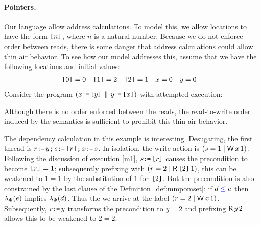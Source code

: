 \paragraph{Pointers.}
Our language allow address calculations.  To model this, we allow locations
to have the form $\texttt{[}n\texttt{]}$, where $n$ is a natural number.  Because we do not
enforce order between reads, there is some danger that address calculations
could allow thin air behavior.   To see how our model addresses this, assume
that we have the following locations and initial values:
\begin{align*}
  \texttt{[}0\texttt{]}&=0  &
  \texttt{[}1\texttt{]}&=2  &
  \texttt{[}2\texttt{]}&=1  &
  x &=0 &
  y &=0 
\end{align*}
Consider the program
\begin{math}
  (x\texttt{:}\mkern-1mu\texttt{=}\,\texttt{[}y\texttt{]} \,\mathbin{\|}\, y\texttt{:}\mkern-1mu\texttt{=}\,\texttt{[}x\texttt{]})
\end{math}
with attempted execution:
\begin{tikzdisplay}[node distance=1em]
\end{tikzdisplay}
Although there is no order enforced between the reads, the read-to-write
order induced by the semantics is sufficient to prohibit this thin-air
behavior.

The dependency calculation in this example is interesting.  Desugaring, the
first thread is $r\texttt{:}\mkern-1mu\texttt{=}\, y\texttt{;}\, s\texttt{:}\mkern-1mu\texttt{=}\, \texttt{[}r\texttt{]}\texttt{;}\, x\texttt{:}\mkern-1mu\texttt{=}\, s$.
In isolation, the write action is $(\bReg=1\mid\DW{x}{1})$.  Following the
discussion of execution \eqref{m1}, $s\texttt{:}\mkern-1mu\texttt{=}\, \texttt{[}r\texttt{]}$ causes the
precondition to become $\texttt{[}r\texttt{]}=1$; subsequently prefixing with
$(\aReg=2\mid\DR{\REF{2}}{1})$, this can be weakened to $1=1$ by the
substitution of $1$ for $\texttt{[}2\texttt{]}$.  But the precondition is also constrained
by the last clause of the Definition~\ref{def:mmpomset}:
 if $d\mathrel{{\color{blue}\leq}}e$ then $\lambda_{\Phi}(e)$ implies $\lambda_{\Phi}(d)$.
%
Thus the we arrive at the label $(\aReg=2\mid\DW{x}{1})$.  Subsequently,
$r\texttt{:}\mkern-1mu\texttt{=}\, y$ transforms the precondition to $y=2$ and prefixing $\DR{y}{2}$
allows this to be weakened to $2=2$.

